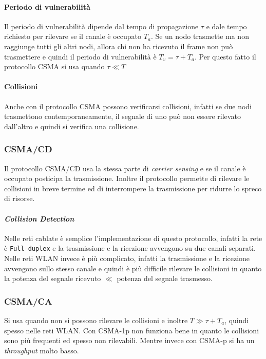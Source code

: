             \paragraph{Periodo di vulnerabilità} Il periodo di vulnerabilità dipende dal tempo di propagazione $\tau$ e dale tempo richiesto per rilevare se il canale è occupato $T_a$. Se un nodo trasmette ma non raggiunge tutti gli altri nodi, allora chi non ha ricevuto il frame non può trasmettere e quindi il periodo di vulnerabilità è $T_v=\tau+T_a$. Per questo fatto il protocollo \Acrshort*{CSMA} si usa quando $\tau\ll T$ 
            \paragraph{Collisioni} Anche con il protocollo \Acrshort*{CSMA} possono verificarsi collisioni, infatti se due nodi trasmettono contemporaneamente, il segnale di uno può non essere rilevato dall'altro e quindi si verifica una collisione.
        \subsubsection{\acrfull*{CSMA/CD}}
            Il protocollo \Acrshort*{CSMA/CD} usa la stessa parte di \textit{carrier sensing} e se il canale è occupato posticipa la trasmissione. Inoltre il protocollo permette di rilevare le collisioni in breve termine ed di interrompere la trasmissione per ridurre lo spreco di risorse.
            \paragraph{\textit{Collision Detection}} Nelle reti cablate è semplice l'implementazione di questo protocollo, infatti la rete è \texttt{Full-duplex} e la trasmissione e la ricezione avvengono su due canali separati. Nelle reti \Acrshort*{WLAN} invece è più complicato, infatti la trasmissione e la ricezione avvengono sullo stesso canale e quindi è più difficile rilevare le collisioni in quanto la potenza del segnale ricevuto $\ll$ potenza del segnale trasmesso.
        \subsubsection{\acrfull*{CSMA/CA}}
            Si usa quando non si possono rilevare le collisioni e inoltre $T\gg \tau+T_a$, quindi spesso nelle reti \Acrshort*{WLAN}. Con \Acrshort*{CSMA-1p} non funziona bene in quanto le collisioni sono più frequenti ed spesso non rilevabili. Mentre invece con \Acrshort{CSMA-p} si ha un \textit{throughput} molto basso.
